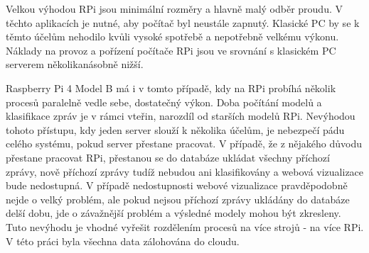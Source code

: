 Velkou výhodou RPi jsou minimální rozměry a hlavně malý odběr proudu. V těchto aplikacích je nutné, aby počítač byl neustále zapnutý. Klasické PC by se k těmto účelům nehodilo kvůli vysoké spotřebě a nepotřebně velkému výkonu. Náklady na provoz a pořízení počítače RPi jsou ve srovnání s klasickém PC serverem několikanásobně nižší. 

Raspberry Pi 4 Model B má i v tomto případě, kdy na RPi probíhá několik procesů paralelně vedle sebe, dostatečný výkon. Doba počítání modelů a klasifikace zpráv je v rámci vteřin, narozdíl od starších modelů RPi. Nevýhodou tohoto přístupu, kdy jeden server slouží k několika účelům, je nebezpečí pádu celého systému, pokud server přestane pracovat. V případě, že z nějakého důvodu přestane pracovat RPi, přestanou se do databáze ukládat všechny příchozí zprávy, nově příchozí zprávy tudíž nebudou ani klasifikovány a webová vizualizace bude nedostupná. V případě nedostupnosti webové vizualizace pravděpodobně nejde o velký problém, ale pokud nejsou příchozí zprávy ukládány do databáze delší dobu, jde o závažnější problém a výsledné modely mohou být zkresleny. Tuto nevýhodu je vhodné vyřešit rozdělením procesů na více strojů - na více RPi. V této práci byla všechna data zálohována do cloudu.